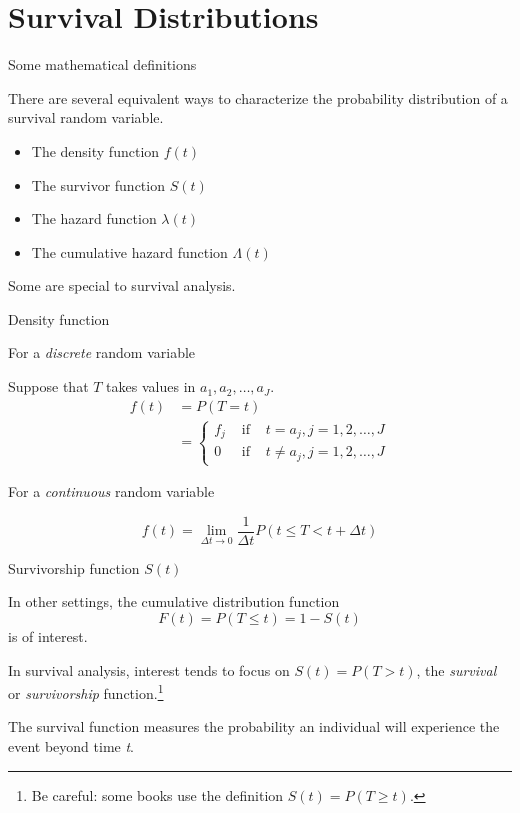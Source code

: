\documentclass[ignorenonframetext,]{beamer}
\providecommand{\tightlist}{%
  \setlength{\itemsep}{0pt}\setlength{\parskip}{0pt}}
\begin{document}
\hypertarget{survival-distributions}{%
\section{Survival Distributions}\label{survival-distributions}}

\begin{frame}{%
\protect\hypertarget{some-mathematical-definitions}{%
Some mathematical definitions}}

There are several equivalent ways to characterize the probability
distribution of a survival random variable.

\begin{itemize}
\tightlist
\item
  The density function \(f(t)\)
\item
  The survivor function \(S(t)\)
\item
  The hazard function \(\lambda(t)\)
\item
  The cumulative hazard function \(\Lambda(t)\)
\end{itemize}

Some are special to survival analysis.

\end{frame}

\begin{frame}{%
\protect\hypertarget{density-function}{%
Density function}}

For a \emph{discrete} random variable

Suppose that \(T\) takes values in \(a_1,a_2, \ldots, a_J\).
\begin{align*}
 f(t) &=  P(T = t) \\
 &=  \left\{ \begin{array}{ccc}
 f_j &\mbox{ if } & t=a_j, j=1,2,\ldots,J \\[1ex]
 0 &\mbox{ if } & t\ne a_j, j=1,2,\ldots,J
 \end{array}
 \right.
 \end{align*}

For a \emph{continuous} random variable

\[  f(t) = \lim_{\Delta t \rightarrow 0}
 \frac{1}{\Delta t}  P(t \le T < t+\Delta t) \]

\end{frame}

\begin{frame}{%
\protect\hypertarget{survivorship-function-st}{%
Survivorship function \(S(t)\)}}

In other settings, the cumulative distribution function
\[F(t)=P(T\le t) = 1- S(t)\] is of interest.

In survival analysis, interest tends to focus on \(S(t) = P(T > t)\),
the \emph{survival} or \emph{survivorship}
function.\footnote{Be careful:  some books use the definition $S(t)=P(T \geq t)$.}

The survival function measures the probability an individual will
experience the event beyond time \emph{t}.

\end{frame}
\end{document}
